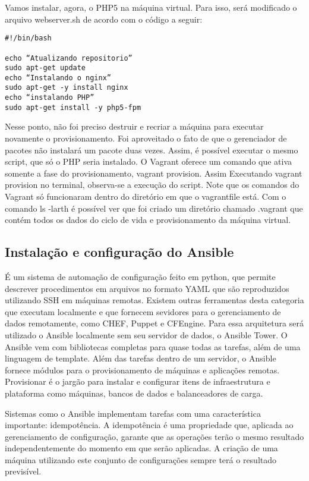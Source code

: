 Vamos instalar, agora, o PHP5 na máquina virtual. Para isso, 
será modificado o arquivo webserver.sh de acordo com o código
a seguir:
\begin{lstlisting}
#!/bin/bash

echo “Atualizando repositorio”
sudo apt-get update
echo “Instalando o nginx”
sudo apt-get -y install nginx
echo “instalando PHP”
sudo apt-get install -y php5-fpm
\end{lstlisting}
Nesse ponto, não foi preciso destruir e recriar a máquina para 
executar novamente o provisionamento. Foi aproveitado o fato 
de que o gerenciador de pacotes não instalará um pacote duas 
vezes. Assim, é possível executar o mesmo script, que só o PHP 
seria instalado. O Vagrant oferece um comando que ativa somente 
a fase do provisionamento, vagrant provision. Assim Executando 
vagrant provision no terminal, observa-se a execução do script. 
Note que os comandos do Vagrant só funcionaram dentro 
do diretório em que o vagrantfile está. 
Com o comando ls -larth é possível ver que foi criado um diretório 
chamado .vagrant que contém todos os dados do ciclo de vida e 
provisionamento da máquina virtual.

\subsection{Instalação e configuração do Ansible}

É um sistema de automação de configuração feito em python, 
que permite descrever procedimentos em arquivos no formato 
YAML que são reproduzidos utilizando SSH em máquinas remotas. 
Existem outras ferramentas desta categoria que executam 
localmente e que fornecem sevidores para o gerenciamento de 
dados remotamente, como CHEF, Puppet e CFEngine. Para essa 
arquitetura será utilizado  
o Ansible localmente sem seu servidor de dados, o Ansible Tower.
O Ansible vem com bibliotecas completas para quase todas as 
tarefas, além de uma linguagem de template. Além das tarefas 
dentro de um servidor, o Ansible fornece módulos para o 
provisionamento de máquinas e aplicações remotas. 
Provisionar é o jargão para instalar e configurar itens de 
infraestrutura e plataforma como máquinas, bancos de dados 
e balanceadores de carga.

Sistemas como o Ansible implementam tarefas com uma 
característica importante: idempotência. A idempotência é 
uma propriedade que, aplicada ao gerenciamento de configuração, 
garante	que as operações terão o mesmo resultado independentemente 
do momento em que serão aplicadas. A criação de uma máquina 
utilizando este conjunto de configurações sempre terá o 
resultado previsível.

